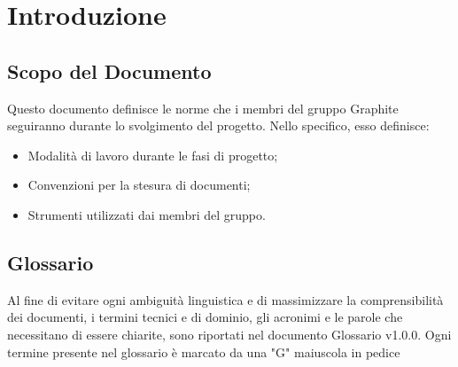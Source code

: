 \documentclass[./NormediProgetto.tex]{subfiles}
\begin{document}
	
\chapter{Introduzione}
\section{Scopo del Documento}
Questo documento definisce le norme che i membri del gruppo Graphite seguiranno durante lo svolgimento del progetto. Nello specifico, esso definisce:
\begin{itemize}
\item Modalità di lavoro durante le fasi di progetto;
\item Convenzioni per la stesura di documenti;
\item Strumenti utilizzati dai membri del gruppo.

\end{itemize}
\section{Glossario}
Al fine di evitare ogni ambiguità linguistica e di massimizzare la comprensibilità dei documenti, i termini tecnici e di dominio, gli acronimi e le parole che necessitano di essere chiarite, sono riportati nel documento Glossario v1.0.0.
Ogni termine presente nel glossario è marcato da una "G" maiuscola in pedice
\end{document}
